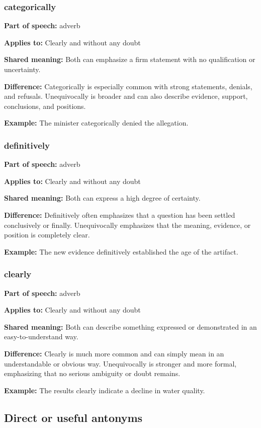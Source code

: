 \documentclass[11pt]{article}
\begin{document}
\subsubsection{categorically}
\textbf{Part of speech:} adverb

\textbf{Applies to:} Clearly and without any doubt

\textbf{Shared meaning:} Both can emphasize a firm statement with no qualification or uncertainty.

\textbf{Difference:} Categorically is especially common with strong statements, denials, and refusals. Unequivocally is broader and can also describe evidence, support, conclusions, and positions.

\textbf{Example:} The minister categorically denied the allegation.

\subsubsection{definitively}
\textbf{Part of speech:} adverb

\textbf{Applies to:} Clearly and without any doubt

\textbf{Shared meaning:} Both can express a high degree of certainty.

\textbf{Difference:} Definitively often emphasizes that a question has been settled conclusively or finally. Unequivocally emphasizes that the meaning, evidence, or position is completely clear.

\textbf{Example:} The new evidence definitively established the age of the artifact.

\subsubsection{clearly}
\textbf{Part of speech:} adverb

\textbf{Applies to:} Clearly and without any doubt

\textbf{Shared meaning:} Both can describe something expressed or demonstrated in an easy-to-understand way.

\textbf{Difference:} Clearly is much more common and can simply mean in an understandable or obvious way. Unequivocally is stronger and more formal, emphasizing that no serious ambiguity or doubt remains.

\textbf{Example:} The results clearly indicate a decline in water quality.

\subsection{Direct or useful antonyms}
\end{document}
